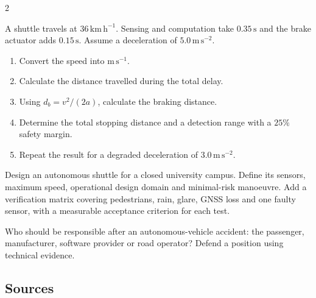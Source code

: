 \begin{multicols}{2}
\begin{applicationexercise}
A shuttle travels at $36\,\mathrm{km\,h^{-1}}$. Sensing and computation take $0.35\,\mathrm{s}$ and
the brake actuator adds $0.15\,\mathrm{s}$. Assume a deceleration of $5.0\,\mathrm{m\,s^{-2}}$.
\begin{enumerate}
\item Convert the speed into $\mathrm{m\,s^{-1}}$.
\item Calculate the distance travelled during the total delay.
\item Using $d_b=v^2/(2a)$, calculate the braking distance.
\item Determine the total stopping distance and a detection range with a $25\%$ safety margin.
\item Repeat the result for a degraded deceleration of $3.0\,\mathrm{m\,s^{-2}}$.
\end{enumerate}
\end{applicationexercise}

\begin{engineeringchallenge}
Design an autonomous shuttle for a closed university campus. Define its sensors, maximum speed,
operational design domain and minimal-risk manoeuvre. Add a verification matrix covering pedestrians,
rain, glare, GNSS loss and one faulty sensor, with a measurable acceptance criterion for each test.
\end{engineeringchallenge}

\begin{speaking}
Who should be responsible after an autonomous-vehicle accident: the passenger, manufacturer, software
provider or road operator? Defend a position using technical evidence.
\end{speaking}
\end{multicols}

\subsection*{Sources}
